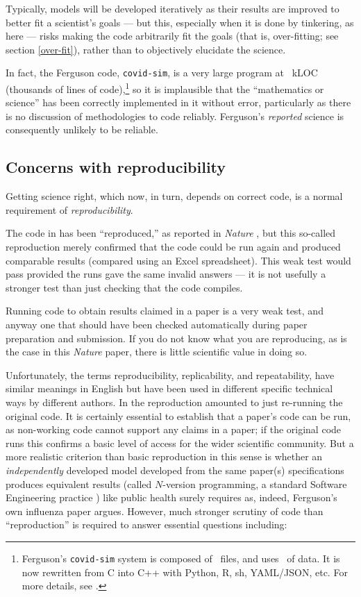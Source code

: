 \documentclass{comjnl}
\begin{document}
\label{discuss-covid-sim}
Typically, models will be developed iteratively as their results are improved to better fit a scientist's goals --- but this, especially when it is done by tinkering, as here --- risks making the code arbitrarily fit the goals (that is, over-fitting; see section \ref{over-fit}), rather than to objectively elucidate the science. 

In fact, the Ferguson code, \texttt{covid-sim}, is a very large program at \covidsimkLOC\ kLOC (thousands of lines of code),\footnote{Ferguson's \texttt{covid-sim} system is composed of \covidsimfiles\ files, and uses \covidsimdata\ of data. It is now rewritten from C into C++ with Python, R, sh, YAML/JSON, etc. For more details, see \supplement.} so it is implausible that the ``mathematics or science'' has been correctly implemented in it without error, particularly as there is no discussion of methodologies to code reliably. Ferguson's \emph{reported\/} science is consequently unlikely to be reliable. 

\subsection{Concerns with reproducibility}
\label{reproducibility-concerns}
Getting science right, which now, in turn, depends on correct code, is a normal requirement of \emph{reproducibility}.

The code in \cite{nature-summary,ICmodel} has been ``reproduced,'' as reported in \emph{Nature\/} \cite{codecheck,thumbs-up}, but this so-called reproduction merely confirmed that the code could be run again and produced comparable results (compared using an Excel spreadsheet). This weak test would pass provided the runs gave the same invalid answers --- it is not usefully a stronger test than just checking that the code compiles.

Running code to obtain results claimed in a paper is a very weak test, and anyway one that should have been checked automatically during paper preparation and submission. If you do not know what you are reproducing, as is the case in this \emph{Nature\/} paper, there is little scientific value in doing so.

Unfortunately, the terms reproducibility, replicability, and repeatability, have similar meanings in English but have been used in different specific technical ways by different authors. In \cite{codecheck,thumbs-up} the reproduction amounted to just re-running the original code. It is certainly essential to establish that a paper's code can be run, as non-working code cannot support any claims in a paper; if the original code runs this confirms a basic level of access for the wider scientific community. But a more realistic criterion than basic reproduction in this sense is whether an \emph{independently\/} developed model developed from the same paper(s) specifications produces equivalent results (called $N$-version programming, a standard Software Engineering practice \cite{NVP}) like public health surely requires as, indeed, Ferguson's own influenza paper \cite{nvp-ferguson} argues. However, much stronger scrutiny of code than ``reproduction'' is required to answer essential questions including:
\end{document}
